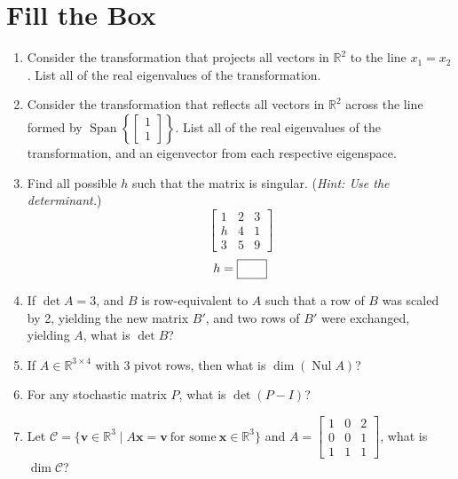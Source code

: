 \documentclass[titlepage]{article}
\renewcommand{\vec}[1]{\mathbf{#1}}
\DeclareMathOperator{\vspan}{Span}
\DeclareMathOperator{\nullspace}{Nul}
\begin{document}
\section{\centering Fill the Box}

\begin{enumerate}
	\item Consider the transformation that projects all vectors in \(\mathbb{R}^2\) to the line \(x_1 = x_2\). List all of the real eigenvalues of the transformation.
		\hfill\fbox{\phantom{\(\lambda_1 = 1, \lambda_2 = 0\)}}
	\item Consider the transformation that reflects all vectors in \(\mathbb{R}^2\) across the line formed by \(\vspan\left\{\begin{bmatrix}1 \\ 1\end{bmatrix}\right\}\). List all of the real 
		eigenvalues of the transformation, and an eigenvector from each respective eigenspace.

		\hfill\fbox{\phantom{\(\lambda_1 = 1, \lambda_2 = 0, \begin{bmatrix}1 \\ 1\end{bmatrix}\)}}
	\item Find all possible \(h\) such that the matrix is singular. (\textit{Hint: Use the determinant.}) \[\begin{bmatrix}1 & 2 & 3 \\ h & 4 & 1 \\ 3 & 5 & 9\end{bmatrix}\]
		\[h = \fbox{\phantom{h, h}}\]

	\item If \(\det A = 3\), and \(B\) is row-equivalent to \(A\) such that a row of \(B\) was scaled by 2, yielding the new matrix \(B'\), and two rows of \(B'\) were exchanged, yielding \(A\), 
		what is \(\det B\)? \hfill \fbox{\phantom{-3/2}}
	
	\item If \(A \in \mathbb{R}^{3 \times 4}\) with 3 pivot rows, then what is \(\dim(\nullspace A)\)? \hfill \fbox{\phantom{1}}

	\item For any stochastic matrix \(P\), what is \(\det(P - I)\)? \hfill \fbox{\phantom{0}}

	\item Let \(\mathcal{C} = \{\vec{v} \in \mathbb{R}^3 \mid A\vec{x} = \vec{v} \ \text{for some} \ \vec{x} \in \mathbb{R}^3\}\) and 
		\(A = \begin{bmatrix}1 & 0 & 2 \\ 0 & 0 & 1 \\ 1 & 1 & 1\end{bmatrix}\), what is \(\dim \mathcal{C}\)? \hfill \fbox{\phantom{23}} 


\end{enumerate}
\end{document}
